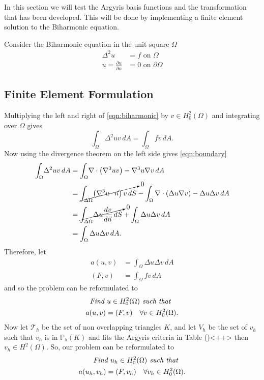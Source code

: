 In this section we will test the Argyris basis functions and the transformation
that has been developed. This will be done by implementing a finite element
solution to the Biharmonic equation.

Consider the Biharmonic equation in the unit square $\Omega$
\begin{subequations} \label{eqn:problem}
\begin{align}
	\Delta^2 u &= f \text{ on } \Omega \label{eqn:biharmonic}\\
	u= \frac{\partial u}{\partial n} &= 0 \text{ on } \partial \Omega
	\label{eqn:boundary}
\end{align}
\end{subequations}
\subsection{Finite Element Formulation}
Multiplying the left and right of \eqref{eqn:biharmonic} by $v\in
H^{2}_0(\Omega)$ and integrating over $\Omega$ gives
\begin{equation*}
	\int_{\Omega}\! \Delta^2 u v \,dA = \int_{\Omega}\! fv \,dA.
\end{equation*}
Now using the divergence theorem on the left side gives
\eqref{eqn:boundary}
\begin{align*}
	\int_{\Omega}\! \Delta^2 u v \,dA & = \int_{\Omega}\! \nabla \cdot
		\left( \nabla^3 u v \right) - \nabla^3 u \nabla v \,dA \\
  &= \cancelto{0}{\int_{\Delta\Omega}\! \left(\nabla^3 u \cdot \vec{n}\right) v \,dS} -
    \int_{\Omega} \nabla \cdot \left(\Delta u \nabla v\right) - \Delta u \Delta v \,dA \\
  &= \cancelto{0}{\int_{\Delta\Omega}\! \Delta u \frac{dv}{d\vec{n}} \,dS} +
    \int_{\Omega} \Delta u \Delta v \,dA \\
  &= \int_{\Omega} \Delta u \Delta v \,dA.
\end{align*}
Therefore, let 
\begin{align*}
	a(u,v) &= \int_{\Omega}\! \Delta u \Delta v \,dA \\
	(F,v) &= \int_{\Omega}\! fv \,dA
\end{align*}
and so the problem can be reformulated to 
\begin{equation}
	\begin{split}
	\text{\emph{Find $u \in H^2_0(\Omega)$ such that}}\quad \\ 
	a(u,v) = (F,v) \quad \forall v \in H^2_0(\Omega).
	\end{split}
\end{equation}
Now let $\mathcal{T}_h$ be the set of non overlapping triangles $K$, and let
$V_h$ be the set of $v_h$ such that $v_h$ is in $\mathbb{P}_5(K)$ and fits the
Argyris criteria in Table ()<++> then $v_h \in H^2(\Omega)$. So,
our problem can be reformulated to
\begin{equation}
	\begin{split}
	\text{\emph{Find $u_h \in H^2_0(\Omega)$ such that}}\quad \\ 
	a(u_h,v_h) = (F,v_h) \quad \forall v_h \in H^2_0(\Omega).
	\end{split}
\end{equation}

